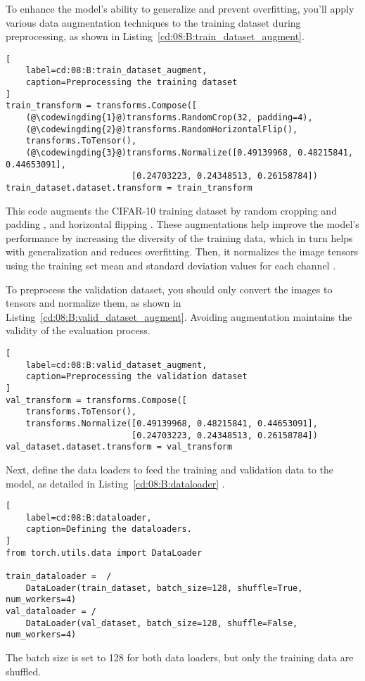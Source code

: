 To enhance the model's ability to generalize and prevent overfitting,  you'll apply various data augmentation techniques to the training dataset during preprocessing, as shown in Listing~\ref{cd:08:B:train_dataset_augment}.
\begin{lstlisting}[
    label=cd:08:B:train_dataset_augment,
    caption=Preprocessing the training dataset
]
train_transform = transforms.Compose([
    (@\codewingding{1}@)transforms.RandomCrop(32, padding=4),
    (@\codewingding{2}@)transforms.RandomHorizontalFlip(), 
    transforms.ToTensor(),
    (@\codewingding{3}@)transforms.Normalize([0.49139968, 0.48215841, 0.44653091], 
                         [0.24703223, 0.24348513, 0.26158784])
train_dataset.dataset.transform = train_transform
\end{lstlisting}
This code augments the CIFAR-10  training dataset by random cropping and padding , and horizontal flipping . These augmentations help improve the model's performance by increasing the diversity of the training data, which in turn helps with generalization and reduces overfitting.
Then, it normalizes the image tensors using the training set mean and standard deviation values for each channel .

To preprocess the validation dataset, you should only convert the images to tensors and normalize them, as shown in Listing~\ref{cd:08:B:valid_dataset_augment}. Avoiding augmentation maintains the validity of the evaluation process.

\begin{lstlisting}[
    label=cd:08:B:valid_dataset_augment,
    caption=Preprocessing the validation dataset
]
val_transform = transforms.Compose([
    transforms.ToTensor(),
    transforms.Normalize([0.49139968, 0.48215841, 0.44653091], 
                         [0.24703223, 0.24348513, 0.26158784])
val_dataset.dataset.transform = val_transform
\end{lstlisting}

Next, define the data loaders to feed the training and validation data to the model, as detailed in Listing~\ref{cd:08:B:dataloader} .
\begin{lstlisting}[
    label=cd:08:B:dataloader,
    caption=Defining the dataloaders.
]
from torch.utils.data import DataLoader

train_dataloader =  /
    DataLoader(train_dataset, batch_size=128, shuffle=True, num_workers=4)
val_dataloader = / 
    DataLoader(val_dataset, batch_size=128, shuffle=False, num_workers=4)
\end{lstlisting}
The batch size is set to 128 for both data loaders, but only the training data are shuffled.

